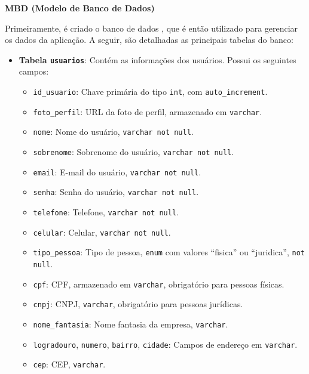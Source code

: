 \textbf{MBD (Modelo de Banco de Dados)}

Primeiramente, é criado o banco de dados , que é então utilizado para gerenciar os dados da aplicação. A seguir, são detalhadas as principais tabelas do banco:

\begin{itemize}
    \item \textbf{Tabela \texttt{usuarios}}: Contém as informações dos usuários. Possui os seguintes campos:
    \begin{itemize}
        \item \texttt{id\_usuario}: Chave primária do tipo \texttt{int}, com \texttt{auto\_increment}.
        \item \texttt{foto\_perfil}: URL da foto de perfil, armazenado em \texttt{varchar}.
        \item \texttt{nome}: Nome do usuário, \texttt{varchar not null}.
        \item \texttt{sobrenome}: Sobrenome do usuário, \texttt{varchar not null}.
        \item \texttt{email}: E-mail do usuário, \texttt{varchar not null}.
        \item \texttt{senha}: Senha do usuário, \texttt{varchar not null}.
        \item \texttt{telefone}: Telefone, \texttt{varchar not null}.
        \item \texttt{celular}: Celular, \texttt{varchar not null}.
        \item \texttt{tipo\_pessoa}: Tipo de pessoa, \texttt{enum} com valores “fisica” ou “juridica”, \texttt{not null}.
        \item \texttt{cpf}: CPF, armazenado em \texttt{varchar}, obrigatório para pessoas físicas.
        \item \texttt{cnpj}: CNPJ, \texttt{varchar}, obrigatório para pessoas jurídicas.
        \item \texttt{nome\_fantasia}: Nome fantasia da empresa, \texttt{varchar}.
        \item \texttt{logradouro}, \texttt{numero}, \texttt{bairro}, \texttt{cidade}: Campos de endereço em \texttt{varchar}.
        \item \texttt{cep}: CEP, \texttt{varchar}.
    \end{itemize}


\end{itemize}
